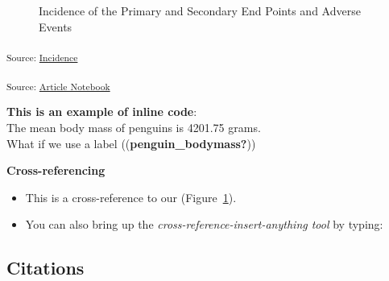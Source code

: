 \documentclass[
  letterpaper,
  DIV=11,
  numbers=noendperiod]{scrartcl}
\providecommand{\tightlist}{%
  \setlength{\itemsep}{0pt}\setlength{\parskip}{0pt}}\usepackage{longtable,booktabs,array}
\begin{document}
\begin{figure}[H]


\caption{\label{fig-incidences-adverse-events}Incidence of the Primary
and Secondary End Points and Adverse Events}

\end{figure}%

\textsubscript{Source:
\href{https://rccline.github.io/quarto-manuscript01/notebooks/incidences-preview.html\#cell-fig-incidences-adverse-events}{Incidence}}

\textsubscript{Source:
\href{https://rccline.github.io/quarto-manuscript01/index.qmd.html}{Article
Notebook}}

\textbf{This is an example of inline code}:\\
The mean body mass of penguins is 4201.75 grams.\\
What if we use a label ((\textbf{penguin\_bodymass?}))

\textbf{Cross-referencing}

\begin{itemize}
\tightlist
\item
  This is a cross-reference to our
  (Figure~\ref{fig-incidences-adverse-events}).\\
\item
  You can also bring up the \emph{cross-reference-insert-anything tool}
  by typing:
\end{itemize}

\subsection{Citations}\label{citations}
\end{document}
